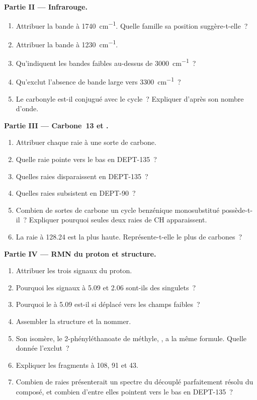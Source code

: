 \begin{problem}
\medskip
\noindent\textbf{Partie II --- Infrarouge.}
\begin{enumerate}[resume]
  \item Attribuer la bande à \qty{1740}{cm^{-1}}. Quelle famille sa position suggère-t-elle~?
  \item Attribuer la bande à \qty{1230}{cm^{-1}}.
  \item Qu'indiquent les bandes faibles au-dessus de \qty{3000}{cm^{-1}}~?
  \item Qu'exclut l'absence de bande large vers \qty{3300}{cm^{-1}}~?
  \item Le carbonyle est-il conjugué avec le cycle~? Expliquer d'après son nombre d'onde.
\end{enumerate}

\medskip
\noindent\textbf{Partie III --- Carbone~13 et .}
\begin{enumerate}[resume]
  \item Attribuer chaque raie à une sorte de carbone.
  \item Quelle raie pointe vers le bas en DEPT-135~?
  \item Quelles raies disparaissent en DEPT-135~?
  \item Quelles raies subsistent en DEPT-90~?
  \item Combien de sortes de carbone un cycle benzénique monosubstitué possède-t-il~? Expliquer pourquoi
        seules deux raies de CH  apparaissent.
  \item La raie à 128.24 est la plus haute. Représente-t-elle le plus de carbones~?
\end{enumerate}

\medskip
\noindent\textbf{Partie IV --- RMN du proton et structure.}
\begin{enumerate}[resume]
  \item Attribuer les trois signaux du proton.
  \item Pourquoi les signaux à 5.09 et 2.06 sont-ils des singulets~?
  \item Pourquoi le  à 5.09 est-il si déplacé vers les champs faibles~?
  \item Assembler la structure et la nommer.
  \item Son isomère, le 2-phényléthanoate de méthyle, , a la même formule. Quelle donnée
        l'exclut~?
  \item Expliquer les fragments à 108, 91 et 43.
  \item Combien de raies présenterait un spectre du  découplé parfaitement résolu du composé,
        et combien d'entre elles pointent vers le bas en DEPT-135~?
\end{enumerate}
\end{problem}
